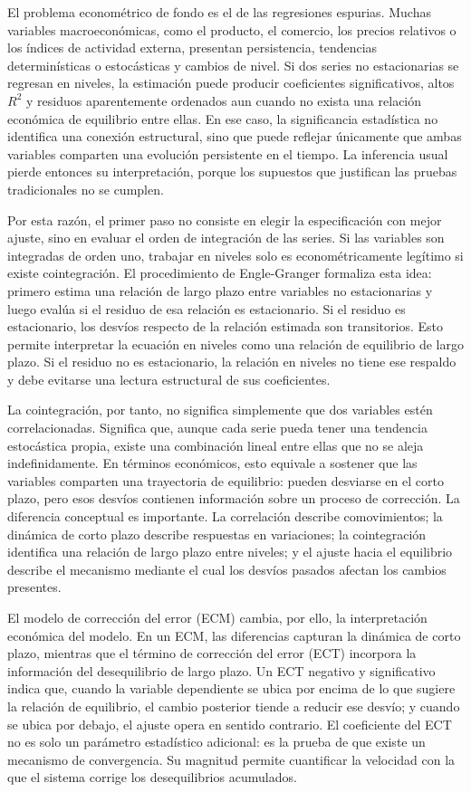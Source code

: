 \documentclass[11pt]{article}
\begin{document}
El problema econométrico de fondo es el de las regresiones espurias. Muchas
variables macroeconómicas, como el producto, el comercio, los precios relativos
o los índices de actividad externa, presentan persistencia, tendencias
determinísticas o estocásticas y cambios de nivel. Si dos series no
estacionarias se regresan en niveles, la estimación puede producir coeficientes
significativos, altos \(R^2\) y residuos aparentemente ordenados aun cuando no
exista una relación económica de equilibrio entre ellas. En ese caso, la
significancia estadística no identifica una conexión estructural, sino que puede
reflejar únicamente que ambas variables comparten una evolución persistente en
el tiempo. La inferencia usual pierde entonces su interpretación, porque los
supuestos que justifican las pruebas tradicionales no se cumplen.

Por esta razón, el primer paso no consiste en elegir la especificación con mejor
ajuste, sino en evaluar el orden de integración de las series. Si las variables
son integradas de orden uno, trabajar en niveles solo es econométricamente
legítimo si existe cointegración. El procedimiento de Engle-Granger formaliza
esta idea: primero estima una relación de largo plazo entre variables no
estacionarias y luego evalúa si el residuo de esa relación es estacionario. Si
el residuo es estacionario, los desvíos respecto de la relación estimada son
transitorios. Esto permite interpretar la ecuación en niveles como una relación
de equilibrio de largo plazo. Si el residuo no es estacionario, la relación en
niveles no tiene ese respaldo y debe evitarse una lectura estructural de sus
coeficientes.

La cointegración, por tanto, no significa simplemente que dos variables estén
correlacionadas. Significa que, aunque cada serie pueda tener una tendencia
estocástica propia, existe una combinación lineal entre ellas que no se aleja
indefinidamente. En términos económicos, esto equivale a sostener que las
variables comparten una trayectoria de equilibrio: pueden desviarse en el corto
plazo, pero esos desvíos contienen información sobre un proceso de corrección.
La diferencia conceptual es importante. La correlación describe comovimientos;
la dinámica de corto plazo describe respuestas en variaciones; la cointegración
identifica una relación de largo plazo entre niveles; y el ajuste hacia el
equilibrio describe el mecanismo mediante el cual los desvíos pasados afectan
los cambios presentes.

El modelo de corrección del error (ECM) cambia, por ello, la interpretación
económica del modelo. En un ECM, las diferencias capturan la dinámica de corto
plazo, mientras que el término de corrección del error (ECT) incorpora la
información del desequilibrio de largo plazo. Un ECT negativo y significativo
indica que, cuando la variable dependiente se ubica por encima de lo que
sugiere la relación de equilibrio, el cambio posterior tiende a reducir ese
desvío; y cuando se ubica por debajo, el ajuste opera en sentido contrario. El
coeficiente del ECT no es solo un parámetro estadístico adicional: es la prueba
de que existe un mecanismo de convergencia. Su magnitud permite cuantificar la
velocidad con la que el sistema corrige los desequilibrios acumulados.
\end{document}
